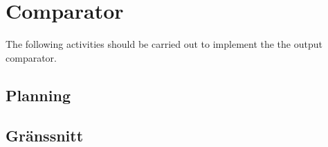 \section{Comparator}
The following activities should be carried out to implement the the output comparator.
\begin{LIPSaktivitetslista}
\end{LIPSaktivitetslista}

\subsection{Planning}
\begin{LIPSaktivitetslista}
\end{LIPSaktivitetslista}

\subsection{Gränssnitt}




